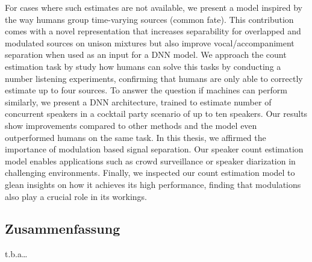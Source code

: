 For cases where such estimates are not available, we present a model inspired by the way humans group time-varying sources (common fate).
This contribution comes with a novel representation that increases separability for overlapped and modulated sources on unison mixtures but also improve vocal/accompaniment separation when used as an input for a DNN model.
We approach the count estimation task by study how humans can solve this tasks by conducting a number listening experiments, confirming that humans are only able to correctly estimate up to four sources.
To answer the question if machines can perform similarly, we present a DNN architecture, trained to estimate number of concurrent speakers in a cocktail party scenario of up to ten speakers.
Our results show improvements compared to other methods and the model even outperformed humans on the same task.
In this thesis, we affirmed the importance of modulation based  signal separation. 
Our speaker count estimation model enables applications such as crowd surveillance or speaker diarization in challenging environments.
Finally, we inspected our count estimation model to glean insights on how it achieves its high performance, finding that modulations also play a crucial role in its workings.

\vfill

\begin{otherlanguage}{ngerman}
\chapter*{Zusammenfassung}
t.b.a\dots
\end{otherlanguage}

\endgroup

\vfill

